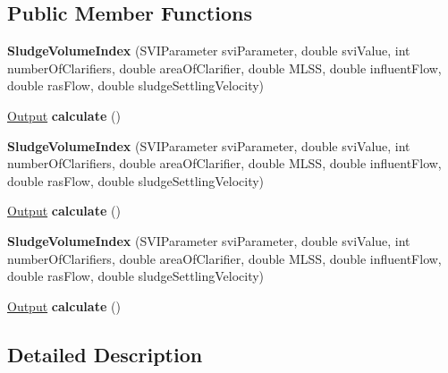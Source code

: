 \subsection*{Public Member Functions}
\begin{DoxyCompactItemize}
\item 
\mbox{\label{class_sludge_volume_index_ac3f99c49e53bfeeb356044976c85754c}} 
{\bfseries Sludge\+Volume\+Index} (S\+V\+I\+Parameter svi\+Parameter, double svi\+Value, int number\+Of\+Clarifiers, double area\+Of\+Clarifier, double M\+L\+SS, double influent\+Flow, double ras\+Flow, double sludge\+Settling\+Velocity)
\item 
\mbox{\label{class_sludge_volume_index_a036495e057a4c969d2377a51f86cbec9}} 
\hyperlink{struct_sludge_volume_index_1_1_output}{Output} {\bfseries calculate} ()
\item 
\mbox{\label{class_sludge_volume_index_ac3f99c49e53bfeeb356044976c85754c}} 
{\bfseries Sludge\+Volume\+Index} (S\+V\+I\+Parameter svi\+Parameter, double svi\+Value, int number\+Of\+Clarifiers, double area\+Of\+Clarifier, double M\+L\+SS, double influent\+Flow, double ras\+Flow, double sludge\+Settling\+Velocity)
\item 
\mbox{\label{class_sludge_volume_index_a8ca86c496964e634eaa8e3a4ccb81728}} 
\hyperlink{struct_sludge_volume_index_1_1_output}{Output} {\bfseries calculate} ()
\item 
\mbox{\label{class_sludge_volume_index_ac3f99c49e53bfeeb356044976c85754c}} 
{\bfseries Sludge\+Volume\+Index} (S\+V\+I\+Parameter svi\+Parameter, double svi\+Value, int number\+Of\+Clarifiers, double area\+Of\+Clarifier, double M\+L\+SS, double influent\+Flow, double ras\+Flow, double sludge\+Settling\+Velocity)
\item 
\mbox{\label{class_sludge_volume_index_a8ca86c496964e634eaa8e3a4ccb81728}} 
\hyperlink{struct_sludge_volume_index_1_1_output}{Output} {\bfseries calculate} ()
\end{DoxyCompactItemize}


\subsection{Detailed Description}


